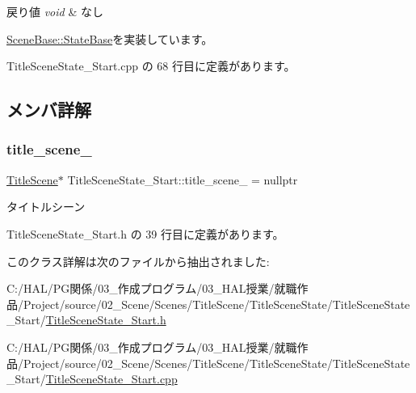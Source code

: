 \begin{DoxyRetVals}{戻り値}
{\em void} & なし \\
\hline
\end{DoxyRetVals}


\mbox{\hyperlink{class_scene_base_1_1_state_base_ad2c6c8fd9f020eb02f64f394edee129c}{Scene\+Base\+::\+State\+Base}}を実装しています。



 Title\+Scene\+State\+\_\+\+Start.\+cpp の 68 行目に定義があります。



\subsection{メンバ詳解}
\mbox{\label{class_title_scene_state___start_a1a0dde9e9834cb18e0cf1e1ab12a2129}} 
\subsubsection{\texorpdfstring{title\+\_\+scene\+\_\+}{title\_scene\_}}
{\footnotesize\ttfamily \mbox{\hyperlink{class_title_scene}{Title\+Scene}}$\ast$ Title\+Scene\+State\+\_\+\+Start\+::title\+\_\+scene\+\_\+ = nullptr\hspace{0.3cm}{\ttfamily [protected]}}



タイトルシーン 



 Title\+Scene\+State\+\_\+\+Start.\+h の 39 行目に定義があります。



このクラス詳解は次のファイルから抽出されました\+:\begin{DoxyCompactItemize}
\item 
C\+:/\+H\+A\+L/\+P\+G関係/03\+\_\+作成プログラム/03\+\_\+\+H\+A\+L授業/就職作品/\+Project/source/02\+\_\+\+Scene/\+Scenes/\+Title\+Scene/\+Title\+Scene\+State/\+Title\+Scene\+State\+\_\+\+Start/\mbox{\hyperlink{_title_scene_state___start_8h}{Title\+Scene\+State\+\_\+\+Start.\+h}}\item 
C\+:/\+H\+A\+L/\+P\+G関係/03\+\_\+作成プログラム/03\+\_\+\+H\+A\+L授業/就職作品/\+Project/source/02\+\_\+\+Scene/\+Scenes/\+Title\+Scene/\+Title\+Scene\+State/\+Title\+Scene\+State\+\_\+\+Start/\mbox{\hyperlink{_title_scene_state___start_8cpp}{Title\+Scene\+State\+\_\+\+Start.\+cpp}}\end{DoxyCompactItemize}
